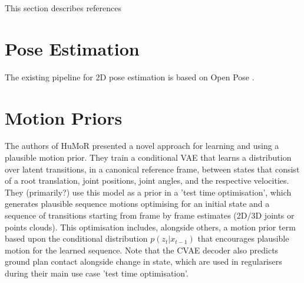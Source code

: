 
This section describes references

\section{Pose Estimation}
The existing pipeline for 2D pose estimation is based on Open Pose \cite{openPose}.


\section{Motion Priors}

The authors of HuMoR \cite{rempe2021humor} presented a novel approach for learning and using a plausible motion prior. They train a conditional VAE that learns a distribution over latent transitions, in a canonical reference frame, between states that consist of a root translation, joint positions, joint angles, and the respective velocities. They (primarily?) use this model as a prior in a 'test time optimisation', which generates plausible sequence motions optimising for an initial state and a sequence of transitions starting from frame by frame estimates (2D/3D joints or points clouds). This optimisation includes, alongside others, a motion prior term based upon the conditional distribution $p(z_t|x_{t-1})$ that encourages plausible motion for the learned sequence. Note that the CVAE decoder also predicts ground plan contact alongside change in state, which are used in regularisers during their main use case 'test time optimisation'.

